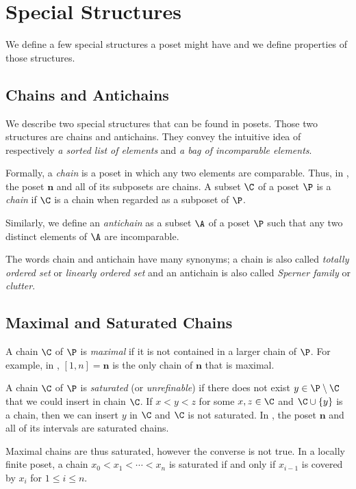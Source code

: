 \section{Special Structures}

We define a few special structures a poset might have and we define properties
of those structures.

\subsection{Chains and Antichains}

We describe two special structures that can be found in
posets. Those two structures are chains and antichains.
They convey the intuitive idea of respectively \emph{a sorted list of
elements} and \emph{a bag of incomparable elements}.

Formally, a \emph{chain} is a poset in which any two elements are
comparable. Thus, in , the poset $\bm{n}$ and all of its
subposets are chains. A subset $\C$ of a poset $\P$ is a \emph{chain} if $\C$ is a
chain when regarded as a subposet of $\P$.

Similarly, we define an \emph{antichain} as a subset $\A$ of a poset $\P$ such
that any two distinct elements of $\A$ are incomparable.

The words chain and antichain have many synonyms; a chain is also called
\emph{totally ordered set} or \emph{linearly ordered set} and an
antichain is also called \emph{Sperner family} or \emph{clutter}.

\subsection{Maximal and Saturated Chains}

A chain \(\C\) of \(\P\) is \emph{maximal} if it is not contained in a larger
chain of $\P$. For example, in , $[1, n] = \bm{n}$ is the
only chain of $\bm{n}$ that is maximal.

A chain $\C$ of $\P$ is \emph{saturated} (or \emph{unrefinable}) if there does not exist
$y \in \P \setminus \C$ that we could insert in chain $\C$. If $x < y < z$ for
some $x, z \in \C$ and $\C \cup \left\{{y}\right\}$ is a chain, then we can insert
$y$ in $\C$ and $\C$ is not saturated. In , the poset
$\bm{n}$ and all of its intervals are saturated chains.

Maximal chains are thus saturated, however the converse is not true. In a
locally finite poset, a chain $x_0 < x_1 < \cdots < x_n$ is saturated if and
only if $x_{i-1}$ is covered by $x_i$ for $1 \le i \le n$.


